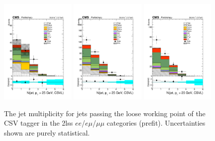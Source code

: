 \begin{figure}[htp]
\centering
\includegraphics[width=0.32\textwidth]{ch5_figs/nJets_CSVL_ttH_ee_stackPlot_SR.pdf}
\includegraphics[width=0.32\textwidth]{ch5_figs/nJets_CSVL_ttH_em_stackPlot_SR.pdf}
\includegraphics[width=0.32\textwidth]{ch5_figs/nJets_CSVL_ttH_mm_stackPlot_SR.pdf} \\
\caption[Data/MC comparison of the CSVL jet multiplicity in the signal region]{The jet multiplicity for jets passing the loose working point of the CSV tagger in the 2lss $ee$/$e\mu$/$\mu\mu$ categories (prefit). Uncertainties shown are purely statistical.}
\label{fig:sr_njets_csvl}
\end{figure}

